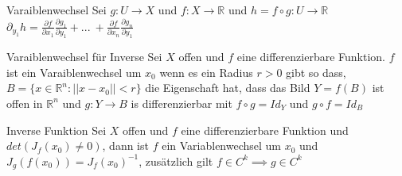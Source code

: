 \begin{Rezept}{Varaiblenwechsel}{}
    Sei $g: U \rightarrow X$ und $f: X \rightarrow \mathbb{R}$ und $h = f \circ g: U \rightarrow \mathbb{R}$\\
    $
    \partial_{y_1}h = \frac{\partial f}{\partial x_1}\frac{\partial g_1}{\partial y_1} + ... \ +  \frac{\partial f}{\partial x_n}\frac{\partial g_n}{\partial y_1}$
\end{Rezept}

\begin{Definition}{Varaiblenwechsel für Inverse}{}
    Sei $X$ offen und $f$ eine differenzierbare Funktion. $f$ ist ein Varaiblenwechsel um $x_0$ wenn es ein Radius $r > 0$ gibt so dass,
    $B = \{x \in \mathbb{R}^n: || x - x_0|| < r\}$ die Eigenschaft hat, dass das Bild $Y = f(B)$ ist offen in $\mathbb{R}^n$
    und $g: Y \rightarrow B$ is differenzierbar mit $f \circ g = Id_Y$ und $g \circ f = Id_B$
\end{Definition}

\begin{Satz}{Inverse Funktion}{}
    Sei $X$ offen und $f$ eine differenzierbare Funktion und $det(J_f(x_0) \neq 0)$, dann ist $f$ ein Variablenwechsel um $x_0$
    und $J_g(f(x_0)) = J_f(x_0)^{-1}$, zusätzlich gilt $f \in C^k \implies g \in C^k$
\end{Satz}